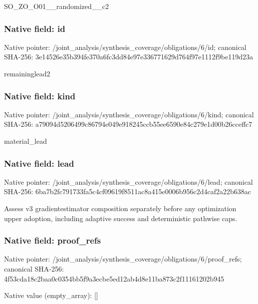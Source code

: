 \documentclass[10pt,a4paper]{article}
\begin{document}
SO\_ZO\_O01\_\_randomized\_\_c2


\subsubsection{Native field: id}


Native pointer: /joint\_analysis/synthesi\allowbreak{}s\_coverage/obligations/6\allowbreak{}/id; canonical SHA-256: 3e14526e35b394fe370a6fc3\allowbreak{}dd84e97e336771629d764f97\allowbreak{}e1112f9be119d23a


remaininglead2


\subsubsection{Native field: kind}


Native pointer: /joint\_analysis/synthesi\allowbreak{}s\_coverage/obligations/6\allowbreak{}/kind; canonical SHA-256: a79094d5206499c86794e049\allowbreak{}e918245ccb55ee6590e84c27\allowbreak{}9e1d00b26cceffc7


material\_lead


\subsubsection{Native field: lead}


Native pointer: /joint\_analysis/synthesi\allowbreak{}s\_coverage/obligations/6\allowbreak{}/lead; canonical SHA-256: 6ba7b2fc791733fa5c4cf096\allowbreak{}19f8511ac8a415e0006b956c\allowbreak{}2d4caf2a22b638ac


Assess v3 gradientestimator composition separately before any optimization upper adoption, including adaptive success and deterministic pathwise caps.


\subsubsection{Native field: proof\_refs}


Native pointer: /joint\_analysis/synthesi\allowbreak{}s\_coverage/obligations/6\allowbreak{}/proof\_refs; canonical SHA-256: 4f53cda18c2baa0c0354bb5f\allowbreak{}9a3ecbe5ed12ab4d8e11ba87\allowbreak{}3c2f11161202b945



Native value (empty\_array): []
\end{document}
